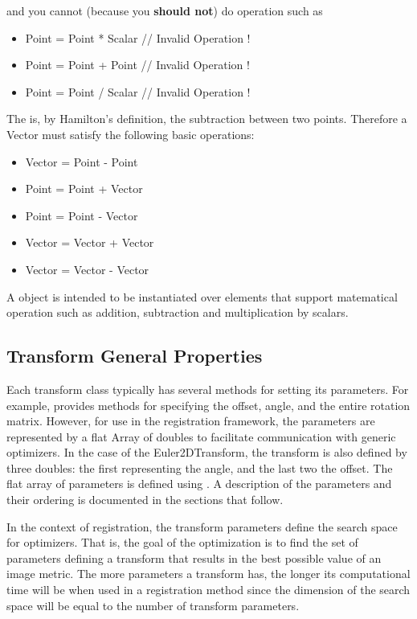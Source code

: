 and you cannot (because you \textbf{should not}) do operation such as

\begin{itemize}
\item Point = Point * Scalar    // Invalid Operation !
\item Point = Point + Point     // Invalid Operation !
\item Point = Point / Scalar    // Invalid Operation !
\end{itemize}

The  is, by Hamilton's definition, the subtraction between two
points. Therefore a Vector must satisfy the following basic operations:

\begin{itemize}
\item Vector = Point - Point
\item Point  = Point + Vector
\item Point  = Point - Vector
\item Vector = Vector + Vector
\item Vector = Vector - Vector
\end{itemize}

A  object is intended to be instantiated over elements that
support matematical operation such as addition, subtraction and multiplication
by scalars.


\subsection{Transform General Properties}
\label{sec:TransformGeneralProperties}

 Each transform class typically has
several methods for setting its parameters.  For example,
 provides methods for specifying the offset,
angle, and the entire rotation matrix.  However, for use in the
registration framework, the parameters are represented by a flat
Array of doubles to facilitate communication with generic
optimizers. In the case of the Euler2DTransform, the transform is also
defined by three doubles: the first representing the angle, and the last two the
offset. The flat array of parameters is defined using . A
description of the parameters and their ordering is documented in the 
sections that follow.
 
In the context of registration, the transform parameters define the search
space for optimizers. That is, the goal of the optimization is to find the set
of parameters defining a transform that results in the best possible value of
an image metric. The more parameters a transform has, the longer its
computational time will be when used in a registration method since the
dimension of the search space will be equal to the number of transform
parameters.

